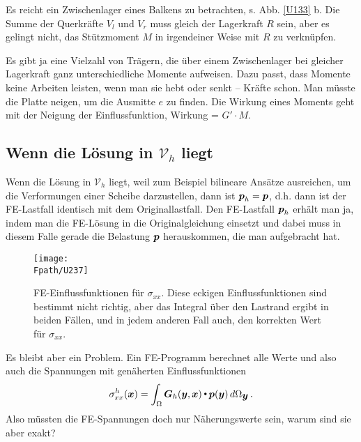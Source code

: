 {Es reicht ein Zwischenlager eines Balkens zu betrachten, s. Abb. \ref{U133} b. Die Summe der Querkr\"{a}fte $V_l$ und $V_r$ muss gleich der Lagerkraft $R$ sein, aber es gelingt nicht, das St\"{u}tzmoment $M$ in irgendeiner Weise mit $R$ zu verkn\"{u}pfen.

Es gibt ja eine Vielzahl von Tr\"{a}gern, die \"{u}ber einem Zwischenlager bei gleicher Lagerkraft ganz unterschiedliche Momente aufweisen. Dazu passt, dass Momente keine Arbeiten leisten, wenn man sie hebt oder senkt -- Kr\"{a}fte schon. Man m\"{u}sste die Platte neigen, um die Ausmitte $e$ zu finden. Die Wirkung eines Moments geht mit der Neigung der Einflussfunktion, Wirkung = $G' \cdot M$.

{\textcolor{sectionTitleBlue}{\section{Wenn die L\"{o}sung in $\mathcal{V}_h$ liegt}}}
Wenn die L\"{o}sung in $\mathcal{V}_h$ liegt, weil zum Beispiel bilineare Ans\"{a}tze ausreichen, um die Verformungen einer Scheibe darzustellen, dann ist $\mbox{\boldmath $p$}_h = \mbox{\boldmath $p$}$, d.h. dann ist der FE-Lastfall identisch mit dem Originallastfall. Den FE-Lastfall $\mbox{\boldmath $p$}_h $ erh\"{a}lt man ja, indem man die FE-L\"{o}sung in die Originalgleichung einsetzt und dabei muss in diesem Falle gerade die Belastung $\mbox{\boldmath $p$}$ herauskommen, die man aufgebracht hat.
\begin{figure}[tbp]
\centering
\if {} \sidecaption \fi
\texttt{[image: \\Fpath/U237]}
  \caption{FE-Einflussfunktionen f\"{u}r $\sigma_{xx}$. Diese \glq eckigen\grq{} Einflussfunktionen sind bestimmt nicht richtig, aber das Integral \"{u}ber den Lastrand ergibt in beiden F\"{a}llen, und in jedem anderen Fall auch, den korrekten Wert f\"{u}r $\sigma_{xx}$.}
  \label{U237}
\end{figure}

Es bleibt aber ein Problem. Ein FE-Programm berechnet alle Werte und also auch die Spannungen mit gen\"{a}herten Einflussfunktionen
\begin{align}
\sigma_{xx}^h(\mbox{\boldmath $x$}) = \int_{\Omega} \mbox{\boldmath $G$}_h(\mbox{\boldmath $y$},\mbox{\boldmath $x$}){\,\scriptscriptstyle \stackrel{\bullet}{{}}}\, \mbox{\boldmath $p$}(\mbox{\boldmath $y$})\,d\Omega_{\mbox{\boldmath $y$}}\,.
\end{align}
Also m\"{u}ssten die FE-Spannungen doch nur N\"{a}herungswerte sein, warum sind sie aber exakt?

}
